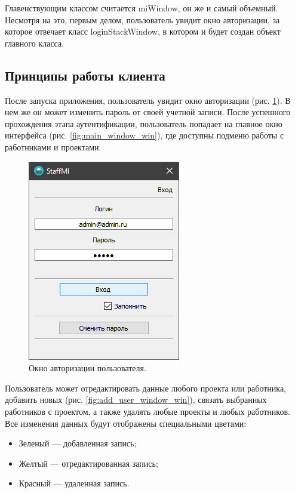 Главенствующим классом считается miWindow, он же и самый объемный. Несмотря на это, первым делом, пользователь увидит окно авторизации, за которое отвечает класс loginStackWindow, в котором и будет создан объект главного класса.


\clearpage
\subsection{Принципы работы клиента}
После запуска приложения, пользователь увидит окно авторизации (рис. \ref{fig:auth_window_win}). В нем же он может изменить пароль от своей учетной записи. После успешного прохождения этапа аутентификации, пользователь попадает на главное окно интерфейса (рис. \ref{fig:main_window_win}), где доступны подменю работы с работниками и проектами.

\begin{figure}[h]
    \centering
    \includegraphics[width=0.4\linewidth]{img/auth_window_win.png}
    \caption{Окно авторизации пользователя.}
    \label{fig:auth_window_win}
\end{figure}

Пользователь может отредактировать данные любого проекта или работника, добавить новых (рис. \ref{fig:add_user_window_win}), связать выбранных работников с проектом, а также удалять любые проекты и любых работников. Все изменения данных будут отображены специальными цветами:
\begin{itemize}
    \item Зеленый --- добавленная запись;
    \item Желтый --- отредактированная запись;
    \item Красный --- удаленная запись.
\end{itemize}

